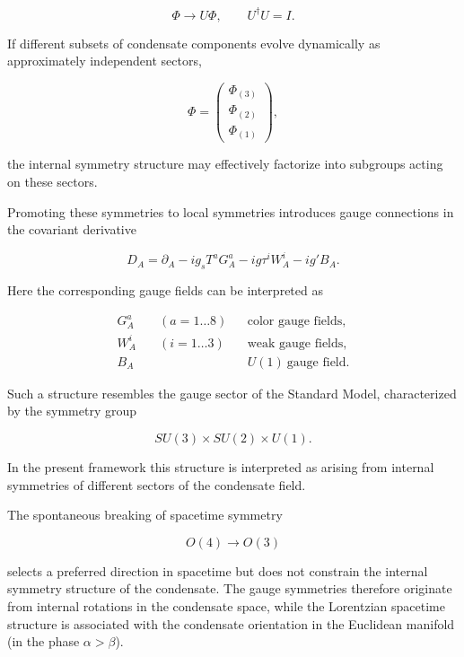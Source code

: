 \documentclass[11pt,a4paper]{article}
\numberwithin{equation}{section}
\begin{document}
\begin{equation}
\Phi \rightarrow U\Phi,
\qquad
U^\dagger U = I .
\end{equation}

If different subsets of condensate components evolve dynamically as
approximately independent sectors,

\begin{equation}
\Phi =
\begin{pmatrix}
\Phi_{(3)} \\
\Phi_{(2)} \\
\Phi_{(1)}
\end{pmatrix},
\end{equation}

the internal symmetry structure may effectively factorize into
subgroups acting on these sectors.

Promoting these symmetries to local symmetries introduces gauge
connections in the covariant derivative

\begin{equation}
D_A =
\partial_A
- i g_s T^a G_A^a
- i g \tau^i W_A^i
- i g' B_A .
\end{equation}

Here the corresponding gauge fields can be interpreted as

\begin{align}
G_A^a & \quad (a=1\dots8) && \text{color gauge fields},\\
W_A^i & \quad (i=1\dots3) && \text{weak gauge fields},\\
B_A   &                   && U(1)\ \text{gauge field}.
\end{align}

Such a structure resembles the gauge sector of the Standard Model,
characterized by the symmetry group

\begin{equation}
SU(3)\times SU(2)\times U(1).
\end{equation}

In the present framework this structure is interpreted as arising from
internal symmetries of different sectors of the condensate field.

The spontaneous breaking of spacetime symmetry

\begin{equation}
O(4)\rightarrow O(3)
\end{equation}

selects a preferred direction in spacetime but does not constrain the
internal symmetry structure of the condensate. The gauge symmetries
therefore originate from internal rotations in the condensate space,
while the Lorentzian spacetime structure is associated with the
condensate orientation in the Euclidean manifold (in the phase $\alpha>\beta$).
\end{document}
